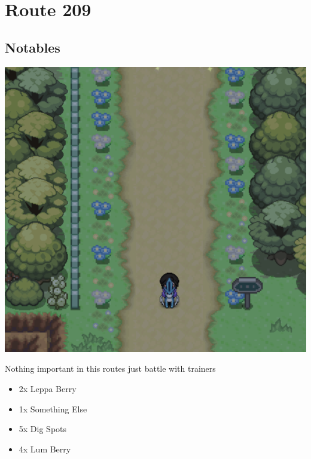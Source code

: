 \documentclass[11pt]{article}
\begin{document}
\section{Route 209}\label{sec:Route_209}

\subsection{Notables}\label{subsec:notables-route-209}

\includegraphics[width=\textwidth]{walkthrough/Sinnoh/Route_209}

Nothing important in this routes just battle with trainers

\begin{itemize}
    \item 2x Leppa Berry
    \item 1x Something Else
    \item 5x Dig Spots
    \item 4x Lum Berry
\end{itemize}



% 
\end{document}
